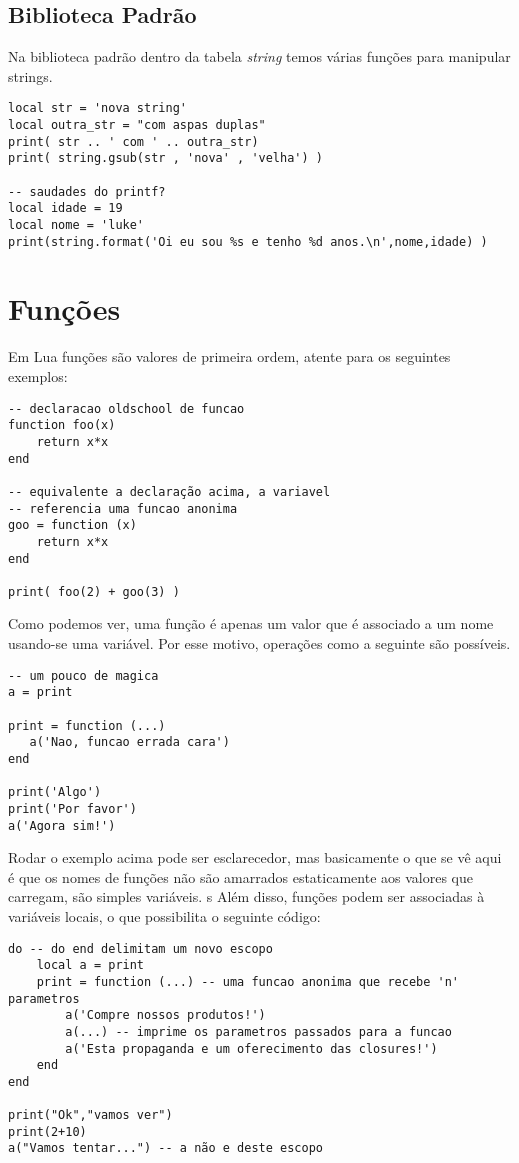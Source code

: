 \documentclass[a4paper,12pt]{abnt}
\begin{document}
\subsection{Biblioteca Padrão}

Na biblioteca padrão dentro da tabela \emph{string}
temos várias funções para manipular strings.

\begin{lstlisting}
local str = 'nova string'
local outra_str = "com aspas duplas"
print( str .. ' com ' .. outra_str)
print( string.gsub(str , 'nova' , 'velha') )

-- saudades do printf?
local idade = 19
local nome = 'luke'
print(string.format('Oi eu sou %s e tenho %d anos.\n',nome,idade) )
\end{lstlisting}

\section{Funções}

Em Lua funções são valores de primeira ordem,
atente para os seguintes exemplos:

\begin{lstlisting}
-- declaracao oldschool de funcao
function foo(x)
    return x*x
end

-- equivalente a declaração acima, a variavel
-- referencia uma funcao anonima
goo = function (x)
    return x*x
end

print( foo(2) + goo(3) )
\end{lstlisting}

Como podemos ver, uma função é apenas um valor que é associado a um
nome usando-se uma variável. Por esse motivo, operações como a seguinte
são possíveis.

\begin{lstlisting}
-- um pouco de magica
a = print

print = function (...)
   a('Nao, funcao errada cara')
end

print('Algo')
print('Por favor')
a('Agora sim!')

\end{lstlisting}

Rodar o exemplo acima pode ser esclarecedor, mas basicamente o que se vê aqui
é que os nomes de funções não são amarrados estaticamente aos
valores que carregam, são simples variáveis.
s
Além disso, funções podem ser associadas à variáveis locais, o que possibilita
o seguinte código:

\begin{lstlisting}
do -- do end delimitam um novo escopo
	local a = print
	print = function (...) -- uma funcao anonima que recebe 'n' parametros
		a('Compre nossos produtos!')
		a(...) -- imprime os parametros passados para a funcao
		a('Esta propaganda e um oferecimento das closures!')
	end
end

print("Ok","vamos ver")
print(2+10)
a("Vamos tentar...") -- a não e deste escopo

\end{lstlisting}
\end{document}
